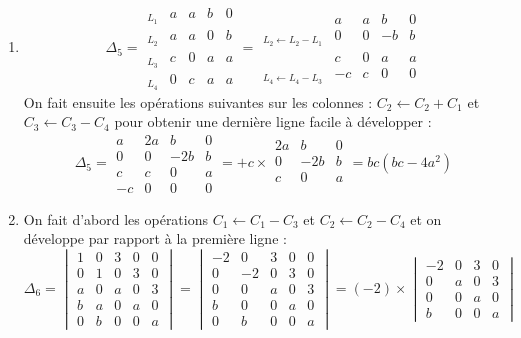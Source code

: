 \documentclass[11pt,a4paper]{article}
\begin{document}
\begin{enumerate}
  \item 
$$\Delta_5 =\begin{array}{l|cccc|} 
_{L_1} &a&a&b&0 \\ _{L_2} & a&a&0&b \\ _{L_3} & c&0&a&a \\ _{L_4} &0&c&a&a
\end{array}
= \begin{array}{l|cccc|} 
 &a&a&b&0 \\ _{L_2\leftarrow L_2-L_1} & 0&0&-b&b \\  & c&0&a&a \\ _{L_4\leftarrow L_4-L_3} & -c&c&0&0
\end{array}
$$
On fait ensuite les opérations suivantes sur les colonnes :
$C_2 \leftarrow C_2+C_1$ et $C_3 \leftarrow C_3-C_4$ pour obtenir 
une dernière ligne facile à développer :
$$\Delta_5 
= \begin{array}{|cccc|} 
 a&2a&b&0 \\ 0&0&-2b&b \\  c&c&0&a \\ -c&0&0&0
\end{array}
= +c \times \begin{array}{|ccc|} 
 2a&b&0 \\ 0&-2b&b \\  c&0&a \\
 \end{array} = bc(bc-4a^2)
$$
  \item
On fait d'abord les opérations $C_1 \leftarrow C_1-C_3$ et $C_2 \leftarrow C_2-C_4$
et on développe par rapport à la première ligne :
$$\Delta_6 = \begin{vmatrix}
1&0&3&0&0 \\ 0&1&0&3&0 \\ a&0&a&0&3 \\ b&a&0&a&0 \\ 0&b&0&0&a  
\end{vmatrix}
=
\begin{vmatrix}
-2&0&3&0&0 \\ 0&-2&0&3&0 \\ 0&0&a&0&3 \\ b&0&0&a&0 \\ 0&b&0&0&a  
\end{vmatrix}
= (-2) \times \begin{vmatrix}
-2&0&3&0 \\ 0&a&0&3 \\ 0&0&a&0 \\ b&0&0&a  
\end{vmatrix}
$$
\end{enumerate}
\end{document}

